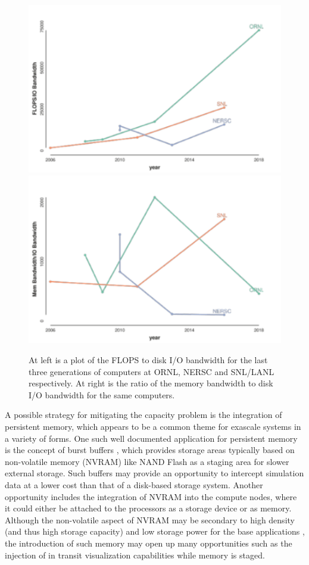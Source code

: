 \begin{refsection}
\begin{figure}[t]
	\includegraphics[width=.45\textwidth]{fig-44L} \space{5mm}	
	\includegraphics[width=.45\textwidth]{fig-44R}
	\caption{At left is a plot of the FLOPS to disk I/O bandwidth for the last three generations of computers at ORNL, NERSC and SNL/LANL respectively. At right is the ratio of the memory bandwidth to disk I/O bandwidth for the same computers.\label{fig:44}}
\end{figure}

A possible strategy for mitigating the capacity problem is the integration of persistent memory, which appears to be a common theme for exascale systems in a variety of forms. One such well documented application for persistent memory is the concept of burst buffers \cite{Bent12}, which provides storage areas typically based on non-volatile memory (NVRAM) like NAND Flash as a staging area for slower external storage. Such buffers may provide an opportunity to intercept simulation data at a lower cost than that of a disk-based storage system. Another opportunity includes the integration of NVRAM into the compute nodes, where it could either be attached to the processors as a storage device or as memory. Although the non-volatile aspect of NVRAM may be secondary to high density (and thus high storage capacity) and low storage power for the base applications \cite{Caulfield10}, the introduction of such memory may open up many opportunities such as the injection of in transit visualization capabilities while memory is staged.


\end{refsection}
